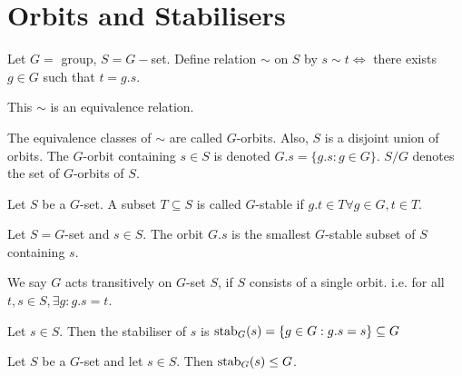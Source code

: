 \section{Orbits and Stabilisers}

Let \(G =\) group, \(S = G-\)set. Define relation \(\sim\) on \(S\) by \(s \sim t \iff\) there exists \(g \in G\) such that \(t = g. s\).

\begin{proposition}
    This \(\sim\) is an equivalence relation.
\end{proposition}

\begin{corol-defn}[Orbits]
The equivalence classes of \(\sim\) are called \(G\)-orbits. Also, \(S\) is a disjoint union of orbits. The \(G\)-orbit containing \(s \in S\) is denoted \(G.s = \{g.s : g \in G\}\). \(S / G\) denotes the set of \(G\)-orbits of \(S\).
\end{corol-defn}

\begin{prop-defn}[\(G\)-stable]
Let \(S\) be a \(G\)-set. A subset \(T \subseteq S\) is called \(G\)-stable if \(g.t \in T \forall g \in G, t \in T\).
\end{prop-defn}

\begin{proposition}
    Let \(S = G\)-set and \(s \in S\). The orbit \(G.s\) is the smallest \(G\)-stable subset of \(S\) containing \(s\).
\end{proposition}

\begin{definition}
    We say \(G\) acts transitively on \(G\)-set \(S\), if \(S\) consists of a single orbit. i.e. for all \(t,s \in S, \exists g: g.s = t\).
\end{definition}

\begin{definition}[Stabilisers]
    Let \(s \in S\). Then the stabiliser of \(s\) is \(\operatorname{stab}_G(s) = \{g \in G: g.s = s\} \subseteq G\)
\end{definition}

\begin{proposition}
    Let \(S\) be a \(G\)-set and let \(s \in S\). Then \(\operatorname{stab}_G(s) \leq G\).
\end{proposition}